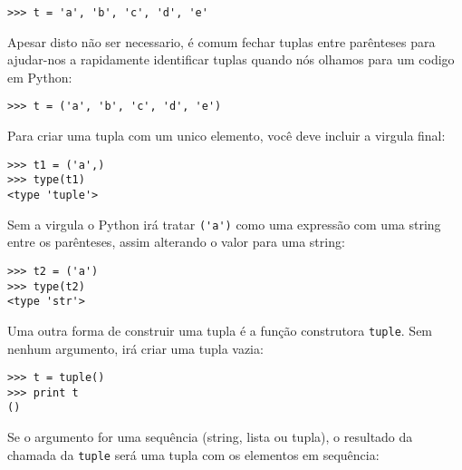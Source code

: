 \beforeverb
\begin{verbatim}
>>> t = 'a', 'b', 'c', 'd', 'e'
\end{verbatim}
\afterverb
%
Apesar disto não ser necessario, é comum fechar tuplas entre parênteses
para ajudar-nos a rapidamente identificar tuplas quando nós olhamos
para um codigo em Python:


\beforeverb
\begin{verbatim}
>>> t = ('a', 'b', 'c', 'd', 'e')
\end{verbatim}
\afterverb
%
Para criar uma tupla com um unico elemento, você deve incluir a virgula
final:


\beforeverb
\begin{verbatim}
>>> t1 = ('a',)
>>> type(t1)
<type 'tuple'>
\end{verbatim}
\afterverb
%
Sem a virgula o Python irá tratar \verb"('a')" como uma expressão
com uma string entre os parênteses, assim alterando o valor para uma string:

\beforeverb
\begin{verbatim}
>>> t2 = ('a')
>>> type(t2)
<type 'str'>
\end{verbatim}
\afterverb
%
Uma outra forma de construir uma tupla é a função construtora {\tt tuple}.
Sem nenhum argumento, irá criar uma tupla vazia:


\beforeverb
\begin{verbatim}
>>> t = tuple()
>>> print t
()
\end{verbatim}
\afterverb
%
Se o argumento for uma sequência (string, lista ou tupla), o resultado
da chamada da {\tt tuple} será uma tupla com os elementos em sequência:

